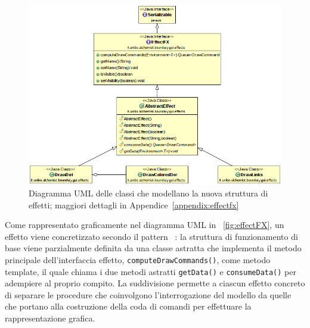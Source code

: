                 \begin{figure}[htbp]
                    \centering
                    \includegraphics[scale=0.5]{img/EffectFXUMLsimple}
                    \caption{Diagramma UML delle classi che modellano la nuova struttura di effetti; maggiori dettagli in Appendice~\ref{appendix:effectfx}} %
                    \label{fig:effectFX}
                \end{figure}

                Come rappresentato graficamente nel diagramma UML in \figurename~\vref{fig:effectFX}, un effetto viene concretizzato secondo il pattern ~\cite{templateMethod}: la struttura di funzionamento di base viene parzialmente definita da una classe astratta che implementa il metodo principale dell'interfaccia effetto, \texttt{computeDrawCommands()}, come metodo template, il quale chiama i due metodi astratti \texttt{getData()} e \texttt{consumeData()} per adempiere al proprio compito.
                La suddivisione permette a ciascun effetto concreto di separare le procedure che coinvolgono l'interrogazione del modello da quelle che portano alla costruzione della coda di comandi per effettuare la rappresentazione grafica.

